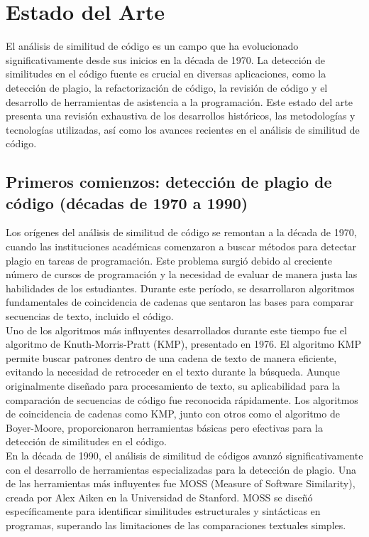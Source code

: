 \chapter{Estado del Arte}\label{chapter:state-of-the-art}

El análisis de similitud de código es un campo que ha evolucionado significativamente desde sus inicios en la década de 1970. La detección de similitudes en el código fuente es crucial en diversas aplicaciones, como la detección de plagio, la refactorización de código, la revisión de código y el desarrollo de herramientas de asistencia a la programación. Este estado del arte presenta una revisión exhaustiva de los desarrollos históricos, las metodologías y tecnologías utilizadas, así como los avances recientes en el análisis de similitud de código.

\section*{\textbf{Primeros comienzos: detección de plagio de código (décadas de 1970 a 1990)}}  
Los orígenes del análisis de similitud de código se remontan a la década de 1970, cuando las instituciones académicas comenzaron a buscar métodos para detectar plagio en tareas de programación. Este problema surgió debido al creciente número de cursos de programación y la necesidad de evaluar de manera justa las habilidades de los estudiantes. Durante este período, se desarrollaron algoritmos fundamentales de coincidencia de cadenas que sentaron las bases para comparar secuencias de texto, incluido el código. \\

Uno de los algoritmos más influyentes desarrollados durante este tiempo fue el algoritmo de Knuth-Morris-Pratt (KMP), presentado en 1976. El algoritmo KMP permite buscar patrones dentro de una cadena de texto de manera eficiente, evitando la necesidad de retroceder en el texto durante la búsqueda. Aunque originalmente diseñado para procesamiento de texto, su aplicabilidad para la comparación de secuencias de código fue reconocida rápidamente. Los algoritmos de coincidencia de cadenas como KMP, junto con otros como el algoritmo de Boyer-Moore, proporcionaron herramientas básicas pero efectivas para la detección de similitudes en el código. \\

En la década de 1990, el análisis de similitud de códigos avanzó significativamente con el desarrollo de herramientas especializadas para la detección de plagio. Una de las herramientas más influyentes fue MOSS (Measure of Software Similarity), creada por Alex Aiken en la Universidad de Stanford. MOSS se diseñó específicamente para identificar similitudes estructurales y sintácticas en programas, superando las limitaciones de las comparaciones textuales simples.

